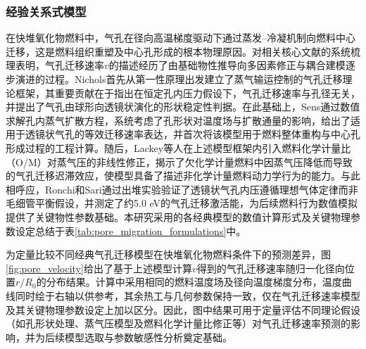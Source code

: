 \subsubsection{经验关系式模型}
在快堆氧化物燃料中，气孔在径向高温梯度驱动下通过蒸发--冷凝机制向燃料中心迁移，这是燃料组织重塑及中心孔形成的根本物理原因。对相关核心文献的系统梳理表明，气孔迁移速率$v$的描述经历了由基础物性推导向多因素修正与耦合建模逐步演进的过程。Nichols\cite{nicholsTheoryColumnarGrain1967,nicholsDiffusionalMobilitiesParticles1972}首先从第一性原理出发建立了蒸气输运控制的气孔迁移理论框架，其重要贡献在于指出在恒定孔内压力假设下，气孔迁移速率与孔径无关，并提出了气孔由球形向透镜状演化的形状稳定性判据。在此基础上，Sens\cite{sensKineticsPoreMovement1972}通过数值求解孔内蒸气扩散方程，系统考虑了孔形状对温度场与扩散通量的影响，给出了适用于透镜状气孔的等效迁移速率表达，并首次将该模型用于燃料整体重构与中心孔形成过程的工程计算。随后，Lackey等人\cite{lackeyPorosityActinideRedistribution1972}在上述模型框架内引入燃料化学计量比（O/M）对蒸气压的非线性修正，揭示了欠化学计量燃料中因蒸气压降低而导致的气孔迁移迟滞效应，使模型具备了描述非化学计量燃料动力学行为的能力。与此相呼应，Ronchi和Sari\cite{ronchiPropertiesLenticularPores1974}通过出堆实验验证了透镜状气孔内压遵循理想气体定律而非毛细管平衡假设，并测定了约5.0 eV的气孔迁移激活能，为后续燃料行为数值模拟提供了关键物性参数基础。本研究采用的各经典模型的数值计算形式及关键物理参数设定总结于表\ref{tab:pore_migration_formulations}中。

为定量比较不同经典气孔迁移模型在快堆氧化物燃料条件下的预测差异，图\ref{fig:pore_velocity}给出了基于上述模型计算$v$得到的气孔迁移速率随归一化径向位置$r/R_0$的分布结果。计算中采用相同的燃料温度场及径向温度梯度分布，温度曲线同时绘于右轴以供参考，其余热工与几何参数保持一致，仅在气孔迁移速率模型及其关键物理参数设定上加以区分。因此，图中结果可用于定量评估不同理论假设（如孔形状处理、蒸气压模型及燃料化学计量比修正等）对气孔迁移速率预测的影响，并为后续模型选取与参数敏感性分析奠定基础。

